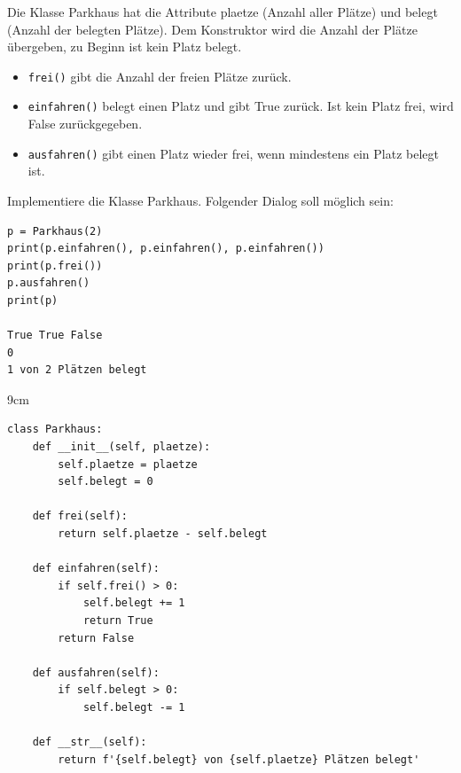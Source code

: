 \question[5]
Die Klasse Parkhaus hat die Attribute plaetze (Anzahl aller Plätze) und belegt (Anzahl der belegten Plätze).
Dem Konstruktor wird die Anzahl der Plätze übergeben, zu Beginn ist kein Platz belegt.
\begin{itemize}
\item \texttt{frei()} gibt die Anzahl der freien Plätze zurück.
\item \texttt{einfahren()} belegt einen Platz und gibt True zurück. Ist kein Platz frei, wird False zurückgegeben.
\item \texttt{ausfahren()} gibt einen Platz wieder frei, wenn mindestens ein Platz belegt ist.
\end{itemize}
Implementiere die Klasse Parkhaus. Folgender Dialog soll möglich sein:
\begin{lstlisting}
p = Parkhaus(2)
print(p.einfahren(), p.einfahren(), p.einfahren())
print(p.frei())
p.ausfahren()
print(p)

True True False
0
1 von 2 Plätzen belegt
\end{lstlisting}
\begin{solutionbox}{9cm}
\begin{lstlisting}
class Parkhaus:
    def __init__(self, plaetze):
        self.plaetze = plaetze
        self.belegt = 0

    def frei(self):
        return self.plaetze - self.belegt

    def einfahren(self):
        if self.frei() > 0:
            self.belegt += 1
            return True
        return False

    def ausfahren(self):
        if self.belegt > 0:
            self.belegt -= 1

    def __str__(self):
        return f'{self.belegt} von {self.plaetze} Plätzen belegt'
\end{lstlisting}
\end{solutionbox}
